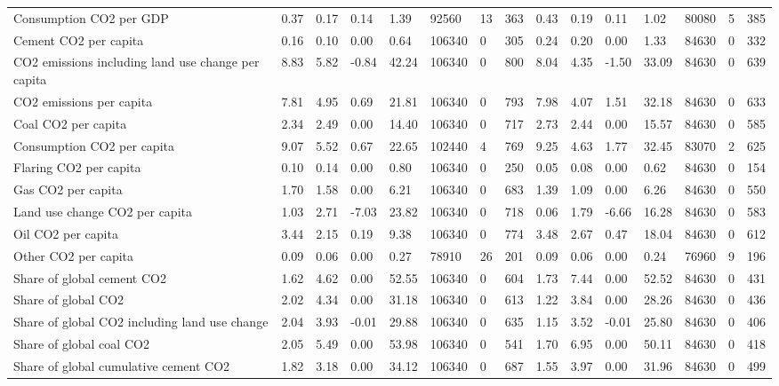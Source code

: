 \begin{longtable}{lllllllllllllll}
\addlinespace
Consumption CO2 per GDP & 0.37 & 0.17 & 0.14 & 1.39 & 92560 & 13 & 363 & 0.43 & 0.19 & 0.11 & 1.02 & 80080 & 5 & 385\\
Cement CO2 per capita & 0.16 & 0.10 & 0.00 & 0.64 & 106340 & 0 & 305 & 0.24 & 0.20 & 0.00 & 1.33 & 84630 & 0 & 332\\
CO2 emissions including land use change per capita & 8.83 & 5.82 & -0.84 & 42.24 & 106340 & 0 & 800 & 8.04 & 4.35 & -1.50 & 33.09 & 84630 & 0 & 639\\
CO2 emissions per capita & 7.81 & 4.95 & 0.69 & 21.81 & 106340 & 0 & 793 & 7.98 & 4.07 & 1.51 & 32.18 & 84630 & 0 & 633\\
Coal CO2 per capita & 2.34 & 2.49 & 0.00 & 14.40 & 106340 & 0 & 717 & 2.73 & 2.44 & 0.00 & 15.57 & 84630 & 0 & 585\\
\addlinespace
Consumption CO2 per capita & 9.07 & 5.52 & 0.67 & 22.65 & 102440 & 4 & 769 & 9.25 & 4.63 & 1.77 & 32.45 & 83070 & 2 & 625\\
Flaring CO2 per capita & 0.10 & 0.14 & 0.00 & 0.80 & 106340 & 0 & 250 & 0.05 & 0.08 & 0.00 & 0.62 & 84630 & 0 & 154\\
Gas CO2 per capita & 1.70 & 1.58 & 0.00 & 6.21 & 106340 & 0 & 683 & 1.39 & 1.09 & 0.00 & 6.26 & 84630 & 0 & 550\\
Land use change CO2 per capita & 1.03 & 2.71 & -7.03 & 23.82 & 106340 & 0 & 718 & 0.06 & 1.79 & -6.66 & 16.28 & 84630 & 0 & 583\\
Oil CO2 per capita & 3.44 & 2.15 & 0.19 & 9.38 & 106340 & 0 & 774 & 3.48 & 2.67 & 0.47 & 18.04 & 84630 & 0 & 612\\
\addlinespace
Other CO2 per capita & 0.09 & 0.06 & 0.00 & 0.27 & 78910 & 26 & 201 & 0.09 & 0.06 & 0.00 & 0.24 & 76960 & 9 & 196\\
Share of global cement CO2 & 1.62 & 4.62 & 0.00 & 52.55 & 106340 & 0 & 604 & 1.73 & 7.44 & 0.00 & 52.52 & 84630 & 0 & 431\\
Share of global CO2 & 2.02 & 4.34 & 0.00 & 31.18 & 106340 & 0 & 613 & 1.22 & 3.84 & 0.00 & 28.26 & 84630 & 0 & 436\\
Share of global CO2 including land use change & 2.04 & 3.93 & -0.01 & 29.88 & 106340 & 0 & 635 & 1.15 & 3.52 & -0.01 & 25.80 & 84630 & 0 & 406\\
Share of global coal CO2 & 2.05 & 5.49 & 0.00 & 53.98 & 106340 & 0 & 541 & 1.70 & 6.95 & 0.00 & 50.11 & 84630 & 0 & 418\\
\addlinespace
Share of global cumulative cement CO2 & 1.82 & 3.18 & 0.00 & 34.12 & 106340 & 0 & 687 & 1.55 & 3.97 & 0.00 & 31.96 & 84630 & 0 & 499\\

\end{longtable}
